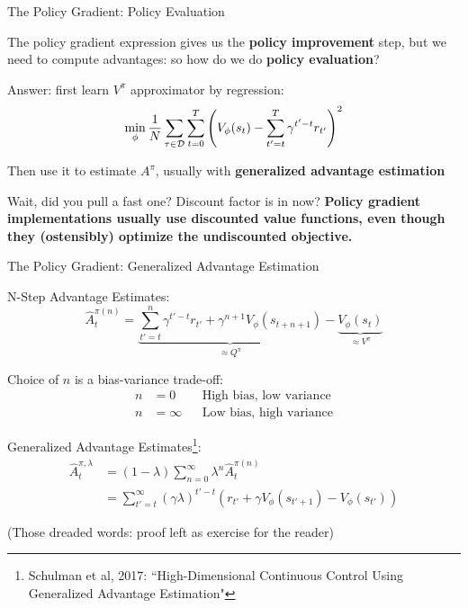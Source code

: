 \documentclass[9pt]{beamer}
\begin{document}
\begin{frame}{The Policy Gradient: Policy Evaluation}

The policy gradient expression gives us the \textbf{policy improvement} step, but we need to compute advantages: so how do we do \textbf{policy evaluation}?

\vspace{1em}

Answer: first learn $V^{\pi}$ approximator by regression:
%
\begin{equation*}
\min_{\phi} \frac{1}{N}\sum_{\tau \in {\mathcal D}} \sum_{t=0}^T \left(V_{\phi}(s_t) - \sum_{t'=t}^T \gamma^{t'-t} r_{t'}\right)^2
\end{equation*}

Then use it to estimate $A^{\pi}$, usually with \textbf{generalized advantage estimation}

\pause
\vspace{2em}

Wait, did you pull a fast one? Discount factor is in now? \textbf{Policy gradient implementations usually use discounted value functions, even though they (ostensibly) optimize the undiscounted objective.}
\end{frame}

\begin{frame}{The Policy Gradient: Generalized Advantage Estimation}

N-Step Advantage Estimates:
%
\begin{equation*}
\hat{A}_t^{\pi(n)} = \underbrace{\sum_{t'=t}^n \gamma^{t'-t} r_{t'} + \gamma^{n+1} V_{\phi}(s_{t+n+1})}_{\approx Q^{\pi}} - \underbrace{V_{\phi}(s_t)}_{\approx V^{\pi}}
\end{equation*}

Choice of $n$ is a bias-variance trade-off:
%
\begin{align*}
n&=0 && \text{High bias, low variance} \\
n&=\infty && \text{Low bias, high variance}
\end{align*}

Generalized Advantage Estimates\footnote{Schulman et al, 2017: ``High-Dimensional Continuous Control Using Generalized Advantage Estimation"}:
%
\begin{align*}
\hat{A}^{\pi, \lambda}_t &= (1 - \lambda) \sum_{n=0}^{\infty} \lambda^n \hat{A}_t^{\pi(n)}  \\
&= \sum_{t'=t}^{\infty} (\gamma \lambda)^{t'-t} \left(r_{t'} + \gamma V_{\phi}(s_{t'+1}) - V_{\phi}(s_{t'})\right)
\end{align*}

(Those dreaded words: proof left as exercise for the reader)
\end{frame}
\end{document}
